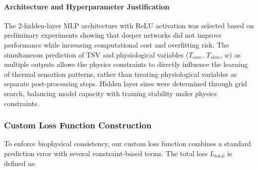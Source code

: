 \paragraph{Architecture and Hyperparameter Justification} The 2-hidden-layer MLP architecture with ReLU activation was selected based on preliminary experiments showing that deeper networks did not improve performance while increasing computational cost and overfitting risk. The simultaneous prediction of TSV and physiological variables ($T_{core}$, $T_{skin}$, $w$) as multiple outputs allows the physics constraints to directly influence the learning of thermal sensation patterns, rather than treating physiological variables as separate post-processing steps. Hidden layer sizes were determined through grid search, balancing model capacity with training stability under physics constraints.

\subsubsection{Custom Loss Function Construction}
To enforce biophysical consistency, our custom loss function combines a standard prediction error with several constraint-based terms. The total loss $L_{\text{total}}$ is defined as:

